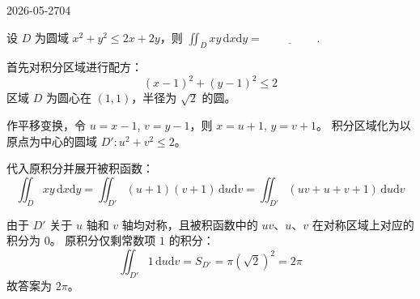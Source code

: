 \begin{mistake}{2026-05-27}{04}

\begin{problemcontent}
设 \(D\) 为圆域 \(x^2 + y^2 \leqslant 2x + 2y\)，则 \(\iint_D xy \,\mathrm{d}x\mathrm{d}y = \underline{\hspace{2cm}}\).
\end{problemcontent}

\begin{solutioncontent}
首先对积分区域进行配方：
\[(x-1)^2 + (y-1)^2 \leqslant 2\]
区域 \(D\) 为圆心在 \((1,1)\)，半径为 \(\sqrt{2}\) 的圆。

作平移变换，令 \(u = x-1\), \(v = y-1\)，则 \(x = u+1\), \(y = v+1\)。
积分区域化为以原点为中心的圆域 \(D' : u^2 + v^2 \leqslant 2\)。

代入原积分并展开被积函数：
\[\iint_D xy \,\mathrm{d}x\mathrm{d}y = \iint_{D'} (u+1)(v+1) \,\mathrm{d}u\mathrm{d}v = \iint_{D'} (uv + u + v + 1) \,\mathrm{d}u\mathrm{d}v\]

由于 \(D'\) 关于 \(u\) 轴和 \(v\) 轴均对称，且被积函数中的 \(uv\)、\(u\)、\(v\) 在对称区域上对应的积分为 \(0\)。
原积分仅剩常数项 \(1\) 的积分：
\[\iint_{D'} 1 \,\mathrm{d}u\mathrm{d}v = S_{D'} = \pi (\sqrt{2})^2 = 2\pi\]
故答案为 \(2\pi\)。
\end{solutioncontent}


\end{mistake}
